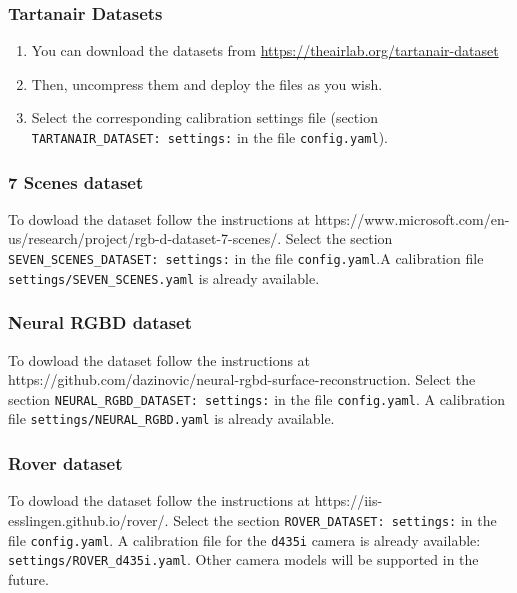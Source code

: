 \documentclass{article}
\providecommand{\tightlist}{%
  \setlength{\itemsep}{0pt}\setlength{\parskip}{0pt}}
\begin{document}
\hypertarget{tartanair-datasets}{%
\subsubsection{Tartanair Datasets}\label{tartanair-datasets}}

\begin{enumerate}
\def\labelenumi{\arabic{enumi}.}
\tightlist
\item
  You can download the datasets from
  \href{https://theairlab.org/tartanair-dataset}{https://theairlab.org/tartanair-dataset}
\item
  Then, uncompress them and deploy the files as you wish.
\item
  Select the corresponding calibration settings file (section
  \texttt{TARTANAIR\_DATASET:\ settings:} in the file
  \texttt{config.yaml}).
\end{enumerate}

\hypertarget{scenes-dataset}{%
\subsubsection{7 Scenes dataset}\label{scenes-dataset}}

To dowload the dataset follow the instructions at
https://www.microsoft.com/en-us/research/project/rgb-d-dataset-7-scenes/.
Select the section \texttt{SEVEN\_SCENES\_DATASET:\ settings:} in the
file \texttt{config.yaml}.A calibration file
\texttt{settings/SEVEN\_SCENES.yaml} is already available.

\hypertarget{neural-rgbd-dataset}{%
\subsubsection{Neural RGBD dataset}\label{neural-rgbd-dataset}}

To dowload the dataset follow the instructions at
https://github.com/dazinovic/neural-rgbd-surface-reconstruction. Select
the section \texttt{NEURAL\_RGBD\_DATASET:\ settings:} in the file
\texttt{config.yaml}. A calibration file
\texttt{settings/NEURAL\_RGBD.yaml} is already available.

\hypertarget{rover-dataset}{%
\subsubsection{Rover dataset}\label{rover-dataset}}

To dowload the dataset follow the instructions at
https://iis-esslingen.github.io/rover/. Select the section
\texttt{ROVER\_DATASET:\ settings:} in the file \texttt{config.yaml}. A
calibration file for the \texttt{d435i} camera is already available:
\texttt{settings/ROVER\_d435i.yaml}. Other camera models will be
supported in the future.
\end{document}
